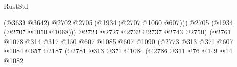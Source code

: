 \begin{lexlean}{RustStd}
\begin{coremodule}
                                                                (@3639 @3642)
                                                                @2702
                                                                @2705
                                                                (@1934 (@2707 @1060 @607)))
                                                              @2705
                                                              (@1934 (@2707 @1050 @1068)))
                                                            @2723
                                                            @2727
                                                            @2732
                                                            @2737
                                                            @2743
                                                            @2750)
                                                          (@2761
                                                            @1078
                                                            @314
                                                            @317
                                                            @150
                                                            @607
                                                            @1085
                                                            @607
                                                            @1090
                                                            (@2773
                                                              @313
                                                              @371
                                                              @607
                                                              @1084
                                                              @657
                                                              @2187
                                                              (@2781
                                                                @313
                                                                @371
                                                                @1084
                                                                (@2786
                                                                  @311
                                                                  @76
                                                                  @149
                                                                  @14
                                                                  @1082

\end{coremodule}
\end{lexlean}
